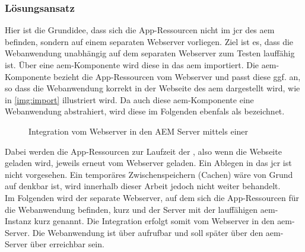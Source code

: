\subsubsection{Lösungsansatz }
\label{sec:ansatz-java}

Hier ist die Grundidee, dass sich die App-Ressourcen nicht im \ac{jcr} des \ac{aem} befinden, sondern auf einem separaten Webserver vorliegen. Ziel ist es, dass die Webanwendung unabhängig auf dem separaten Webserver zum Testen lauffähig ist. Über eine \ac{aem}-Komponente wird diese in das \ac{aem} importiert. Die \ac{aem}-Komponente bezieht die App-Ressourcen vom Webserver und passt diese ggf. an, so dass die Webanwendung korrekt in der Webseite des \ac{aem} dargestellt wird, wie in \autoref{img:import} illustriert wird. Da auch diese \ac{aem}-Komponente eine Webanwendung abstrahiert, wird diese im Folgenden ebenfals als \ajc bezeichnet.

\begin{figure}[H]
	\begin{center}
		
		\caption{Integration vom Webserver in den AEM Server mittels einer \ajc}
		\label{img:import}
	\end{center}
\end{figure}
Dabei werden die App-Ressourcen zur Laufzeit der \ajc, also wenn die Webseite geladen wird, jeweils erneut vom Webserver geladen. Ein Ablegen in das \ac{jcr} ist nicht vorgesehen. Ein temporäres Zwischenspeichern (Cachen) wäre von Grund auf denkbar ist, wird innerhalb dieser Arbeit jedoch nicht weiter behandelt. \\
Im Folgenden wird der separate Webserver, auf dem sich die App-Ressourcen für die Webanwendung befinden, kurz  und der Server mit der lauffähigen \ac{aem}-Instanz kurz  genannt. Die Integration erfolgt somit vom Webserver in den \ac{aem}-Server. Die Webanwendung ist über \serverB aufrufbar und soll später über den \ac{aem}-Server über \serverA erreichbar sein.\\






